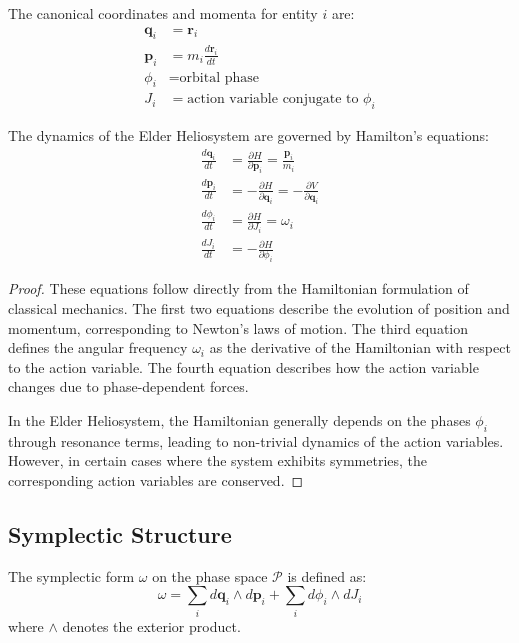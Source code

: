 \begin{definition}
The canonical coordinates and momenta for entity $i$ are:
\begin{align}
\mathbf{q}_i &= \mathbf{r}_i \\
\mathbf{p}_i &= m_i \frac{d\mathbf{r}_i}{dt} \\
\phi_i &= \text{orbital phase} \\
J_i &= \text{action variable conjugate to } \phi_i
\end{align}
\end{definition}

\begin{theorem}
The dynamics of the Elder Heliosystem are governed by Hamilton's equations:
\begin{align}
\frac{d\mathbf{q}_i}{dt} &= \frac{\partial H}{\partial \mathbf{p}_i} = \frac{\mathbf{p}_i}{m_i} \\
\frac{d\mathbf{p}_i}{dt} &= -\frac{\partial H}{\partial \mathbf{q}_i} = -\frac{\partial V}{\partial \mathbf{q}_i} \\
\frac{d\phi_i}{dt} &= \frac{\partial H}{\partial J_i} = \omega_i \\
\frac{dJ_i}{dt} &= -\frac{\partial H}{\partial \phi_i}
\end{align}
\end{theorem}

\begin{proof}
These equations follow directly from the Hamiltonian formulation of classical mechanics. The first two equations describe the evolution of position and momentum, corresponding to Newton's laws of motion. The third equation defines the angular frequency $\omega_i$ as the derivative of the Hamiltonian with respect to the action variable. The fourth equation describes how the action variable changes due to phase-dependent forces.

In the Elder Heliosystem, the Hamiltonian generally depends on the phases $\phi_i$ through resonance terms, leading to non-trivial dynamics of the action variables. However, in certain cases where the system exhibits symmetries, the corresponding action variables are conserved.
\end{proof}

\subsection{Symplectic Structure}

\begin{definition}
The symplectic form $\omega$ on the phase space $\mathcal{P}$ is defined as:
\begin{equation}
\omega = \sum_i d\mathbf{q}_i \wedge d\mathbf{p}_i + \sum_i d\phi_i \wedge dJ_i
\end{equation}
where $\wedge$ denotes the exterior product.
\end{definition}

